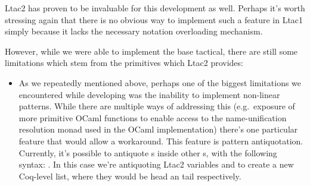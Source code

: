 Ltac2 has proven to be invaluable for this development as well.
Perhaps it's worth stressing again that there is no obvious way to implement such a feature in Ltac1 simply because it lacks the necessary notation overloading mechanism.

However, while we were able to implement the base tactical, there are still some limitations which stem from the primitives which Ltac2 provides:
\begin{itemize}
\item
  As we repeatedly mentioned above, perhaps one of the biggest limitations we encountered while developing  was the inability to implement non-linear patterns.
While there are multiple ways of addressing this (e.g.\ exposure of more primitive
OCaml functions to enable access to the name-unification resolution monad used in the OCaml implementation) there's one particular feature that would allow a workaround.
  This feature is pattern antiquotation.
  Currently, it's possible to antiquote s inside other s, with the following syntax: .
    In this case we're antiquoting Ltac2 variables  and  to create a new Coq-level list, where they would be head an tail respectively.


\end{itemize}
